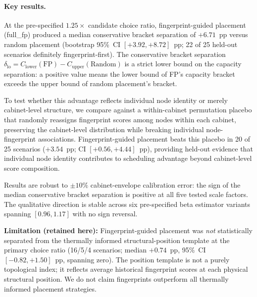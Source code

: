 \paragraph{Key results.}
At the pre-specified $1.25{\times}$ candidate choice ratio, fingerprint-guided
placement (full\_fp) produced a median conservative bracket separation of
$+6.71$~pp versus random placement
(bootstrap 95\%~CI $[{+}3.92, {+}8.72]$~pp; 22 of 25 held-out scenarios
definitely fingerprint-first). The conservative bracket separation
$\delta_{\mathrm{lo}} = C_{\mathrm{lower}}(\mathrm{FP}) -
C_{\mathrm{upper}}(\mathrm{Random})$ is a strict lower bound on the capacity
separation: a positive value means the lower bound of FP's capacity bracket
exceeds the upper bound of random placement's bracket.

To test whether this advantage reflects individual node identity or merely
cabinet-level structure, we compare against a within-cabinet permutation
placebo that randomly reassigns fingerprint scores among nodes within each
cabinet, preserving the cabinet-level distribution while breaking individual
node-fingerprint associations. Fingerprint-guided placement beats this placebo
in 20 of 25 scenarios ($+3.54$~pp; CI $[{+}0.56, {+}4.44]$~pp),
providing held-out evidence that individual node identity contributes to
scheduling advantage beyond cabinet-level score composition.

Results are robust to $\pm10\%$ cabinet-envelope calibration error: the sign
of the median conservative bracket separation is positive at all five tested
scale factors.
The qualitative direction is stable across six pre-specified beta estimator
variants spanning $[0.96, 1.17]$ with no sign reversal.

\noindent\textbf{Limitation (retained here):}
Fingerprint-guided placement was \emph{not} statistically separated from the
thermally informed structural-position template at the primary choice ratio
(16/5/4 scenarios; median $+0.74$~pp, 95\%~CI $[{-}0.82, {+}1.50]$~pp,
spanning zero). The position template is not a purely topological index; it
reflects average historical fingerprint scores at each physical structural
position. We do not claim fingerprints outperform all thermally informed
placement strategies.


